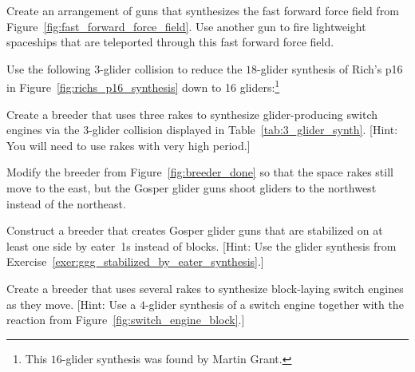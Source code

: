 \begin{multicols}{2}
\mfilbreak


\begin{problem}\label{exer:synthesize_ffff}
	Create an arrangement of guns that synthesizes the fast forward force field from Figure~\ref{fig:fast_forward_force_field}. Use another gun to fire lightweight spaceships that are teleported through this fast forward force field.
\end{problem}


\mfilbreak


\begin{problem}\label{exer:rich_p16_16}
	Use the following $3$-glider collision to reduce the $18$-glider synthesis of Rich's p16 in Figure~\ref{fig:richs_p16_synthesis} down to 16 gliders:\footnote{This $16$-glider synthesis was found by Martin Grant.}
	\begin{center}
	\end{center}
\end{problem}


\mfilbreak


\begin{problem}\label{exer:glider_producing_switch_breeder}
	Create a breeder that uses three rakes to synthesize glider-producing switch engines via the $3$-glider collision displayed in Table~\ref{tab:3_glider_synth}. [Hint: You will need to use rakes with very high period.]
\end{problem}


\mfilbreak


\begin{problem}\label{exer:breeder_done_northwest}
	Modify the breeder from Figure~\ref{fig:breeder_done} so that the space rakes still move to the east, but the Gosper glider guns shoot gliders to the northwest instead of the northeast.
\end{problem}


\mfilbreak


\begin{problem}\label{exer:ggg_eater_side_breeder}
	Construct a breeder that creates Gosper glider guns that are stabilized on at least one side by eater~1s instead of blocks. [Hint: Use the glider synthesis from Exercise~\ref{exer:ggg_stabilized_by_eater_synthesis}.]
\end{problem}


\mfilbreak


\begin{problem}\label{exer:block_laying_switch_breeder}
	Create a breeder that uses several rakes to synthesize block-laying switch engines as they move. [Hint: Use a $4$-glider synthesis of a switch engine together with the reaction from Figure~\ref{fig:switch_engine_block}.]
\end{problem}



\end{multicols}
